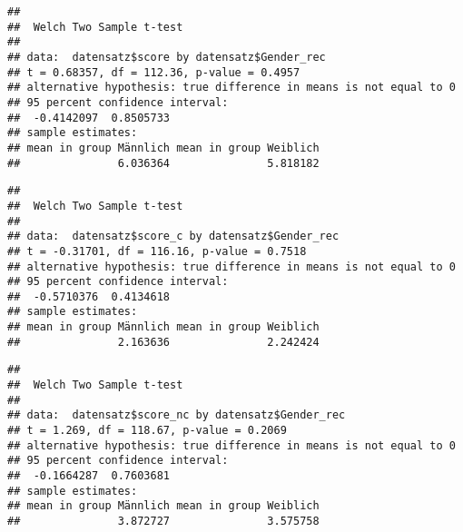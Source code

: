 \documentclass[]{article}
\newenvironment{Shaded}{\begin{snugshade}}{\end{snugshade}}
\newcommand{\KeywordTok}[1]{\textcolor[rgb]{0.13,0.29,0.53}{\textbf{#1}}}
\newcommand{\StringTok}[1]{\textcolor[rgb]{0.31,0.60,0.02}{#1}}
\newcommand{\OperatorTok}[1]{\textcolor[rgb]{0.81,0.36,0.00}{\textbf{#1}}}
\newcommand{\NormalTok}[1]{#1}
\begin{document}
\begin{verbatim}
## 
##  Welch Two Sample t-test
## 
## data:  datensatz$score by datensatz$Gender_rec
## t = 0.68357, df = 112.36, p-value = 0.4957
## alternative hypothesis: true difference in means is not equal to 0
## 95 percent confidence interval:
##  -0.4142097  0.8505733
## sample estimates:
## mean in group Männlich mean in group Weiblich 
##               6.036364               5.818182
\end{verbatim}

\begin{Shaded}
\end{Shaded}

\begin{verbatim}
## 
##  Welch Two Sample t-test
## 
## data:  datensatz$score_c by datensatz$Gender_rec
## t = -0.31701, df = 116.16, p-value = 0.7518
## alternative hypothesis: true difference in means is not equal to 0
## 95 percent confidence interval:
##  -0.5710376  0.4134618
## sample estimates:
## mean in group Männlich mean in group Weiblich 
##               2.163636               2.242424
\end{verbatim}

\begin{Shaded}
\end{Shaded}

\begin{verbatim}
## 
##  Welch Two Sample t-test
## 
## data:  datensatz$score_nc by datensatz$Gender_rec
## t = 1.269, df = 118.67, p-value = 0.2069
## alternative hypothesis: true difference in means is not equal to 0
## 95 percent confidence interval:
##  -0.1664287  0.7603681
## sample estimates:
## mean in group Männlich mean in group Weiblich 
##               3.872727               3.575758
\end{verbatim}

\begin{Shaded}
\end{Shaded}
\end{document}
